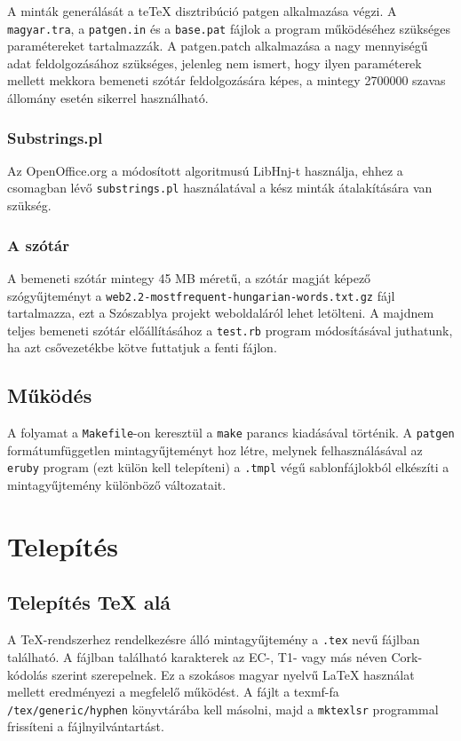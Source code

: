 \documentclass[12pt]{article}
\begin{document}
A minták generálását a te\TeX{} disztribúció patgen alkalmazása végzi.
A \texttt{magyar.tra}, a \texttt{patgen.in} és a \texttt{base.pat}
fájlok a program működéséhez szükséges paramétereket tartalmazzák.
A patgen.patch alkalmazása a nagy mennyiségű adat feldolgozásához
szükséges, jelenleg nem ismert, hogy ilyen paraméterek mellett mekkora
bemeneti szótár feldolgozására képes, a mintegy 2700000 szavas állomány
esetén sikerrel használható.


\subsubsection{Substrings.pl}

Az OpenOffice.org a módosított algoritmusú LibHnj-t használja, ehhez
a csomagban lévő \texttt{substrings.pl} használatával a kész minták
átalakítására van szükség.


\subsubsection{A szótár}

A bemeneti szótár mintegy 45 MB méretű, a szótár magját képező szógyűjteményt
a \texttt{web2.2-mostfrequent-hungarian-words.txt.gz} fájl tartalmazza,
ezt a Szószablya projekt weboldaláról lehet letölteni. A majdnem teljes
bemeneti szótár előállításához a \texttt{test.rb} program módosításával
juthatunk, ha azt csővezetékbe kötve futtatjuk a fenti fájlon.


\subsection{Működés}

A folyamat a \texttt{Makefile}-on keresztül a \texttt{make} parancs
kiadásával történik. A \texttt{patgen} formátumfüggetlen mintagyűjteményt
hoz létre, melynek felhasználásával az \texttt{eruby} program (ezt
külön kell telepíteni) a \texttt{.tmpl} végű sablonfájlokból elkészíti
a mintagyűjtemény különböző változatait.


\section{Telepítés}


\subsection{Telepítés \TeX{} alá}

A \TeX{}-rendszerhez rendelkezésre álló mintagyűjtemény a \texttt{.tex}
nevű fájlban található. A fájlban található karakterek az EC-, T1-
vagy más néven Cork-kódolás szerint szerepelnek. Ez a szokásos magyar
nyelvű \LaTeX{} használat mellett eredményezi a megfelelő működést.
A fájlt a texmf-fa \texttt{/tex/generic/hyphen} könyvtárába kell másolni,
majd a \texttt{mktexlsr} programmal frissíteni a fájlnyilvántartást.
\end{document}
